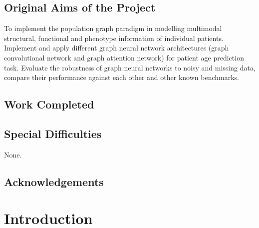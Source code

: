 \documentclass[12pt,a4paper,twoside, openright, hidelinks]{report}
\begin{document}

\section*{Original Aims of the Project}

To implement the population graph paradigm in modelling multimodal structural, functional and phenotype information of individual patients. Implement and apply different graph neural network architectures (graph convolutional network and graph attention network) for patient age prediction task. Evaluate the robustness of graph neural networks to noisy and missing data, compare their performance against each other and other known benchmarks.

\section*{Work Completed}

\section*{Special Difficulties}

None.

\tableofcontents

\newpage
\section*{Acknowledgements}

\pagestyle{headings}

\chapter{Introduction}
\end{document}
